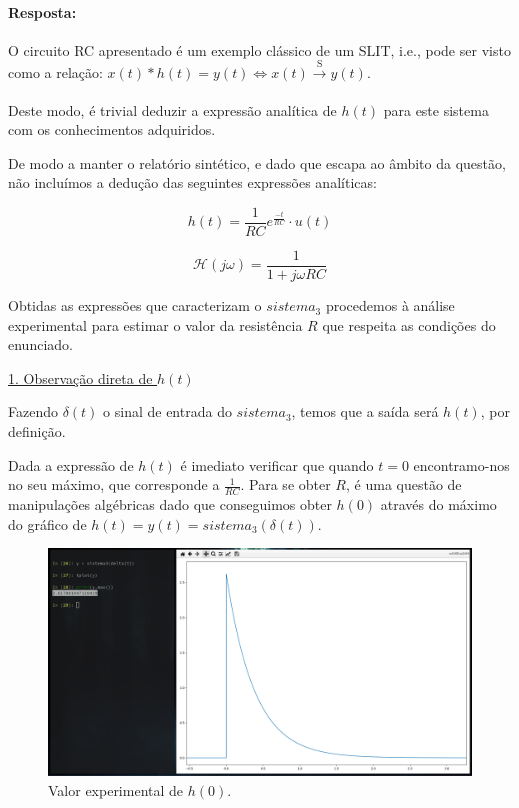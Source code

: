 \paragraph{Resposta:} %
O circuito RC apresentado é um exemplo clássico de um SLIT, i.e., pode ser visto como a relação: \(x(t) * h(t) = y (t) \iff x(t) \xrightarrow[]{\text{S}} y(t)\).

Deste modo, é trivial deduzir a expressão analítica de \(h(t)\) para este sistema com os conhecimentos adquiridos. 

De modo a manter o relatório sintético, e dado que escapa ao âmbito da questão, não incluímos a dedução das seguintes expressões analíticas\footnotemark[4]:

$$ h(t) = \frac{1}{RC}e^{\frac{-t}{RC}} \cdot u(t) $$

$$ \mathcal{H}(j\omega) = \frac{1}{1 + j\omega RC} $$

Obtidas as expressões que caracterizam o \(sistema_3\) procedemos à análise experimental para estimar o valor da resistência \(R\) que respeita as condições do enunciado.


\begin{normalsize}
\vspace{0.5cm}
\underline{1. Observação direta de \(h(t)\)} 
\vspace{0.25cm}
\end{normalsize}

Fazendo \(\delta(t)\) o sinal de entrada do \(sistema_3\), temos que a saída será \(h(t)\), por definição.

Dada a expressão de \(h(t)\) é imediato verificar que quando \(t = 0\) encontramo-nos no seu máximo, que corresponde a \(\frac{1}{RC}\). Para se obter \(R\), é uma questão de manipulações algébricas dado que conseguimos obter \(h(0)\) através do máximo do gráfico de \(h(t) = y(t) = sistema_{3}(\delta(t))\).

\begin{figure}[H]
    \centering
    \includegraphics[width = 0.5\linewidth]{prints/ht.png}
    \caption{Valor experimental de \(h(0)\).}
    \label{fig:ht}
\end{figure}

